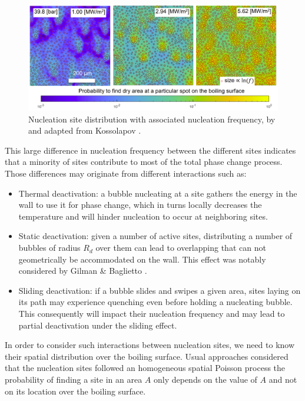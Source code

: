 \begin{figure}[!h]
\centering
\includegraphics[width=0.9\linewidth]{img/site_interaction/site_f_kossolapov.PNG}
\caption{Nucleation site distribution with associated nucleation frequency, by and adapted from Kossolapov \cite{kossolapov_experimental_2021}.}
\label{fig:sites_f_koss}
\end{figure}

\npar

This large difference in nucleation frequency between the different sites indicates that a minority of sites contribute to most of the total phase change process. Those differences may originate from different interactions such as:

\begin{itemize}
\item Thermal deactivation: a bubble nucleating at a site gathers the energy in the wall to use it for phase change, which in turns locally decreases the temperature and will hinder nucleation to occur at neighboring sites.
\item Static deactivation: given a number of active sites, distributing a number of bubbles of radius $R_{d}$ over them can lead to overlapping that can not geometrically be accommodated on the wall. This effect was notably considered by Gilman \& Baglietto \cite{gilman_self-consistent_2017}.
\item Sliding deactivation: if a bubble slides and swipes a given area, sites laying on its path may experience quenching even before holding a nucleating bubble. This consequently will impact their nucleation frequency and may lead to partial deactivation under the sliding effect.
\end{itemize} 


In order to consider such interactions between nucleation sites, we need to know their spatial distribution over the boiling surface. Usual approaches considered that the nucleation sites followed an homogeneous spatial Poisson process \ie the probability of finding a site in an area $A$ only depends on the value of $A$ and not on its location over the boiling surface.

